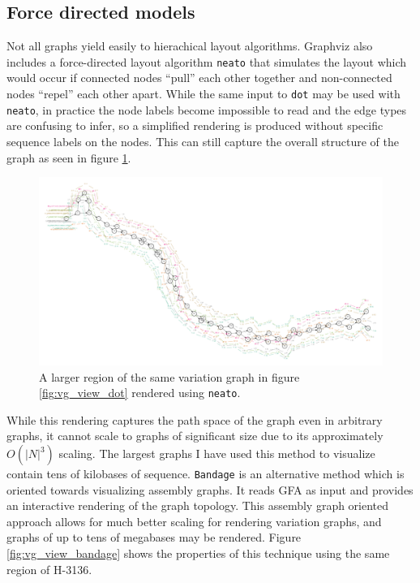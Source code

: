 \subsection{Force directed models}

Not all graphs yield easily to hierachical layout algorithms.
Graphviz also includes a force-directed layout algorithm {\tt neato} that simulates the layout which would occur if connected nodes ``pull'' each other together and non-connected nodes ``repel'' each other apart.
While the same input to {\tt dot} may be used with {\tt neato}, in practice the node labels become impossible to read and the edge types are confusing to infer, so a simplified rendering is produced without specific sequence labels on the nodes.
This can still capture the overall structure of the graph as seen in figure \ref{fig:vg_view_neato}.

\begin{figure}[htbp!] 
\centering    
\includegraphics[width=1.0\textwidth]{Chapter2/Figs/Vector/vg_view_dpS_H-3136_neato.pdf}
\caption{A larger region of the same variation graph in figure \ref{fig:vg_view_dot} rendered using {\tt neato}.}
\label{fig:vg_view_neato}
\end{figure}

While this rendering captures the path space of the graph even in arbitrary graphs, it cannot scale to graphs of significant size due to its approximately $O(|N|^3)$ scaling.
The largest graphs I have used this method to visualize contain tens of kilobases of sequence.
{\tt Bandage} \cite{wick2015bandage} is an alternative method which is oriented towards visualizing assembly graphs.
It reads GFA as input and provides an interactive rendering of the graph topology.
This assembly graph oriented approach allows for much better scaling for rendering variation graphs, and graphs of up to tens of megabases may be rendered.
Figure \ref{fig:vg_view_bandage} shows the properties of this technique using the same region of H-3136.

